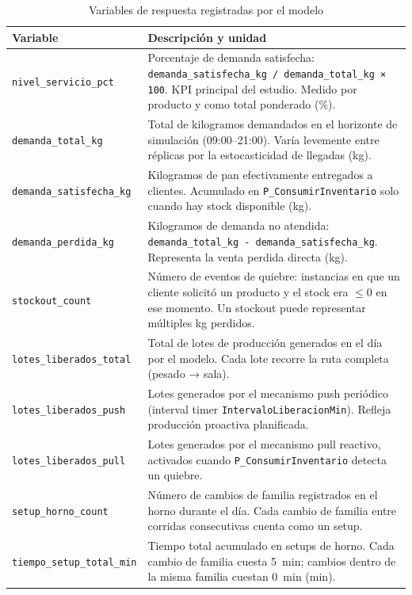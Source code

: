 \documentclass[12pt]{article}
\begin{document}
\begin{table}[H]
\centering
\caption{Variables de respuesta registradas por el modelo}
\label{tab:tallies}
\renewcommand{\arraystretch}{1.3}
\begin{tabularx}{\textwidth}{lX}
\toprule
\rowcolor{tabhead}
\color{white}\textbf{Variable} &
\color{white}\textbf{Descripción y unidad} \\
\midrule
\rowcolor{tabrow}\texttt{nivel\_servicio\_pct}       & Porcentaje de demanda satisfecha: \texttt{demanda\_satisfecha\_kg / demanda\_total\_kg × 100}. KPI principal del estudio. Medido por producto y como total ponderado (\%). \\
\texttt{demanda\_total\_kg}          & Total de kilogramos demandados en el horizonte de simulación (09:00--21:00). Varía levemente entre réplicas por la estocasticidad de llegadas (kg). \\
\rowcolor{tabrow}\texttt{demanda\_satisfecha\_kg}    & Kilogramos de pan efectivamente entregados a clientes. Acumulado en \texttt{P\_ConsumirInventario} solo cuando hay stock disponible (kg). \\
\texttt{demanda\_perdida\_kg}        & Kilogramos de demanda no atendida: \texttt{demanda\_total\_kg - demanda\_satisfecha\_kg}. Representa la venta perdida directa (kg). \\
\rowcolor{tabrow}\texttt{stockout\_count}            & Número de eventos de quiebre: instancias en que un cliente solicitó un producto y el stock era $\leq 0$ en ese momento. Un stockout puede representar múltiples kg perdidos. \\
\texttt{lotes\_liberados\_total}     & Total de lotes de producción generados en el día por el modelo. Cada lote recorre la ruta completa (pesado → sala). \\
\rowcolor{tabrow}\texttt{lotes\_liberados\_push}     & Lotes generados por el mecanismo push periódico (interval timer \texttt{IntervaloLiberacionMin}). Refleja producción proactiva planificada. \\
\texttt{lotes\_liberados\_pull}      & Lotes generados por el mecanismo pull reactivo, activados cuando \texttt{P\_ConsumirInventario} detecta un quiebre. \\
\rowcolor{tabrow}\texttt{setup\_horno\_count}        & Número de cambios de familia registrados en el horno durante el día. Cada cambio de familia entre corridas consecutivas cuenta como un setup. \\
\texttt{tiempo\_setup\_total\_min}   & Tiempo total acumulado en setups de horno. Cada cambio de familia cuesta 5~min; cambios dentro de la misma familia cuestan 0~min (min). \\
\bottomrule
\end{tabularx}
\end{table}
\end{document}
